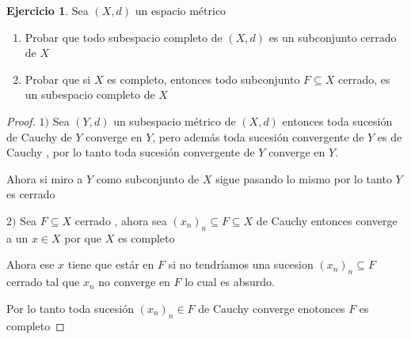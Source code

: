 \documentclass[12pt]{article}
\theoremstyle{definition}
\newtheorem{ej}{Ejercicio}
\begin{document}
\begin{ej}
  Sea $(X,d)$ un espacio métrico
  \begin{enumerate}
    \item Probar que todo subespacio completo de $(X,d)$ es un subconjunto cerrado de $X$
    \item Probar que si $X$ es completo, entonces todo subconjunto $F \subseteq X$ cerrado, es un subespacio completo de $X$
  \end{enumerate}
  \begin{proof}
  $1)$ Sea $(Y,d)$ un subespacio métrico de $(X,d)$ entonces toda sucesión de Cauchy de $Y$ converge en $Y$, pero además toda sucesión convergente de $Y$ es de Cauchy , por lo tanto toda sucesión convergente de $Y$ converge en $Y$.

  Ahora si miro a $Y$ como subconjunto de $X$ sigue pasando lo mismo por lo tanto $Y$ es cerrado

$2)$ Sea $F \subseteq  X$ cerrado , ahora sea $(x_n)_n \subseteq F \subseteq X$ de Cauchy entonces converge a un $x \in X$ por que $X$ es completo

Ahora ese $x$ tiene que estár en $F$ si no tendríamos una sucesion $(x_n)_n \subseteq F$ cerrado tal que $x_n$ no converge en $F$ lo cual es absurdo.

Por lo tanto toda sucesión $(x_n)_n \in F$ de Cauchy converge enotonces $F$ es completo
  \end{proof}
\end{ej}
\end{document}
